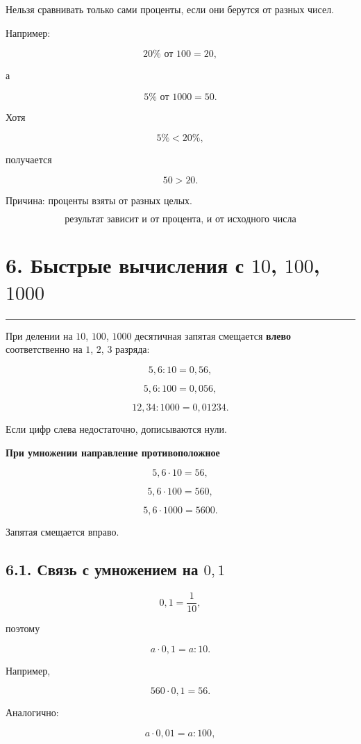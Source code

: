 \documentclass[a4paper,12pt]{article}
\newcommand{\sectionline}{%
    \vspace{0.2em}
    {\color{accent}\rule{\linewidth}{0.6pt}}
    \vspace{0.5em}
}
\newcommand{\important}[1]{%
    \par\medskip
    {\color{darkaccent}\textbf{#1}}
    \par\smallskip
}
\begin{document}
Нельзя сравнивать только сами проценты, если они берутся от разных чисел.

Например:

\[
20\%\text{ от }100
=
20,
\]

а

\[
5\%\text{ от }1000
=
50.
\]

Хотя

\[
5\%<20\%,
\]

получается

\[
50>20.
\]

Причина: проценты взяты от разных целых.

\[
\boxed{
\text{результат зависит и от процента, и от исходного числа}
}
\]

\section*{\color{darkaccent}6. Быстрые вычисления с \(10\), \(100\), \(1000\)}
\sectionline

При делении на \(10\), \(100\), \(1000\) десятичная запятая смещается
\textbf{влево} соответственно на \(1\), \(2\), \(3\) разряда:

\[
5{,}6:10=0{,}56,
\]

\[
5{,}6:100=0{,}056,
\]

\[
12{,}34:1000=0{,}01234.
\]

Если цифр слева недостаточно, дописываются нули.

\important{При умножении направление противоположное}

\[
5{,}6\cdot10=56,
\]

\[
5{,}6\cdot100=560,
\]

\[
5{,}6\cdot1000=5600.
\]

Запятая смещается вправо.

\subsection*{\color{accent}6.1. Связь с умножением на \(0{,}1\)}

\[
0{,}1=\frac{1}{10},
\]

поэтому

\[
a\cdot0{,}1=a:10.
\]

Например,

\[
560\cdot0{,}1=56.
\]

Аналогично:

\[
a\cdot0{,}01=a:100,
\]
\end{document}
